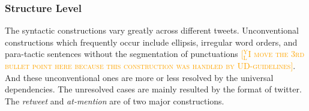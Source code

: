 \documentclass[11pt,letterpaper]{article}
\newcommand{\heart}{\ensuremath\heartsuit}
\newcommand{\yjcomment}[1]{\textcolor{orange}{[$_\mathrm{L}^\mathrm{Y}$\textsc{#1}]}}
\begin{document}
%


	
\subsubsection{Structure Level}
The syntactic constructions vary greatly across different tweets.
Unconventional constructions which frequently occur include ellipsis, irregular word orders, and para-tactic sentences without the segmentation of punctuations \yjcomment{I move the 3rd bullet point here because this construction was handled by UD-guidelines}.
And these unconventional ones are more or less resolved by the universal dependencies.
The unresolved cases are mainly resulted by the format of twitter.
The {\it retweet} and {\it at-mention} are of two major constructions.
\end{document}
